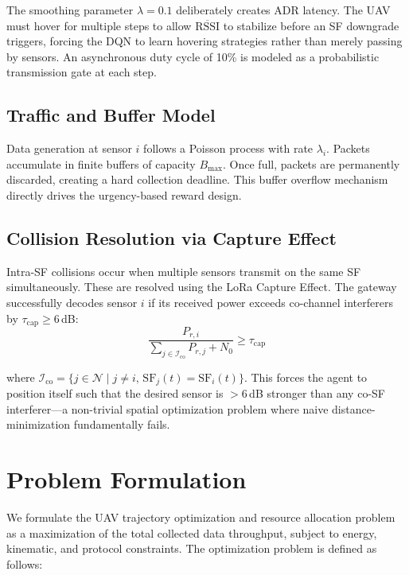 \documentclass[conference]{IEEEtran}
\begin{document}
The smoothing parameter $\lambda = 0.1$ deliberately creates ADR latency. The UAV must hover for multiple steps to allow $\overline{\text{RSSI}}$ to stabilize before an SF downgrade triggers, forcing the DQN to learn hovering strategies rather than merely passing by sensors. An asynchronous duty cycle of 10\% is modeled as a probabilistic transmission gate at each step.

\subsection{Traffic and Buffer Model}

Data generation at sensor $i$ follows a Poisson process with rate $\lambda_i$. Packets accumulate in finite buffers of capacity $B_{\max}$. Once full, packets are permanently discarded, creating a hard collection deadline. This buffer overflow mechanism directly drives the urgency-based reward design.

\subsection{Collision Resolution via Capture Effect}

Intra-SF collisions occur when multiple sensors transmit on the same SF simultaneously. These are resolved using the LoRa Capture Effect. The gateway successfully decodes sensor $i$ if its received power exceeds co-channel interferers by $\tau_{\text{cap}} \geq 6$\,dB:
\begin{equation}
\frac{P_{r,i}}{\sum_{j \in \mathcal{I}_{\text{co}}} P_{r,j} + N_0} \geq \tau_{\text{cap}}
\label{eq:capture}
\end{equation}

where $\mathcal{I}_{\text{co}} = \{j \in \mathcal{N} \mid j \neq i,\, \text{SF}_j(t) = \text{SF}_i(t)\}$. This forces the agent to position itself such that the desired sensor is $>6$\,dB stronger than any co-SF interferer---a non-trivial spatial optimization problem where naive distance-minimization fundamentally fails.

\section{Problem Formulation}

We formulate the UAV trajectory optimization and resource allocation problem as a maximization of the total collected data throughput, subject to energy, kinematic, and protocol constraints. The optimization problem is defined as follows:
\end{document}
